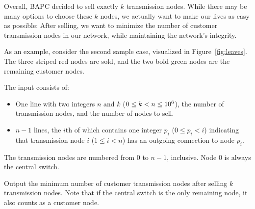 Overall, BAPC decided to sell exactly $k$ transmission nodes.
While there may be many options to choose these $k$ nodes, we actually want to make our lives as easy as possible:
After selling, we want to minimize the number of customer transmission nodes in our network, while maintaining the network's integrity.

As an example, consider the second sample case, visualized in Figure~\ref{fig:leaves}.
The three striped red nodes are sold, and the two bold green nodes are the remaining customer nodes.

\begin{Input}
    The input consists of:
    \begin{itemize}
        \item One line with two integers $n$ and $k$ ($0\leq k < n\leq 10^6$), the number of transmission nodes, and the number of nodes to sell.
        \item
            $n-1$ lines, the \(i\)th of which contains one integer \(p_i\) (\(0 \leq p_i < i\))
            indicating that transmission node \(i\) (\(1 \leq i < n\)) has an outgoing connection to node \(p_i\).
    \end{itemize}

    The transmission nodes are numbered from \(0\) to \(n - 1\), inclusive.
    Node $0$ is always the central switch.
\end{Input}

\begin{Output}
    Output the minimum number of customer transmission nodes after selling $k$ transmission nodes.
    Note that if the central switch is the only remaining node, it also counts as a customer node.
\end{Output}
